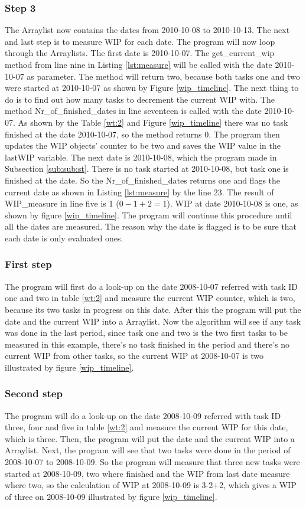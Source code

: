 \documentclass[UKenglish]{ifimaster}  %
\begin{document}
\subsubsection{Step 3}
The Arraylist now contains the dates from 2010-10-08 to 2010-10-13. The next and last step is to measure WIP for each date.  The program will now loop through the Arraylists. The first date is 2010-10-07.  The get\_current\_wip method from line nine in Listing \ref{lst:measure} will be called with the date 2010-10-07 as parameter.  The method will return two, because both tasks one and two were started at 2010-10-07 as shown by Figure \ref{wip_timeline}. The next thing to do is to find out how many tasks to decrement the current WIP with.  The method Nr\_of\_finished\_dates in line seventeen is called with the date 2010-10-07. As shown by the Table \ref{wt:2} and Figure \ref{wip_timeline} there was no task finished at the date 2010-10-07, so the method returns 0. The program then updates the WIP objects' counter to be two and saves the WIP value in the lastWIP variable. The next date is 2010-10-08, which the program made in Subsection \ref{sub:sub:st}. There is no task started at 2010-10-08, but task one is finished at the date. So the Nr\_of\_finished\_dates returns one and flags the current date as shown in Listing \ref{lst:measure} by the line 23. The result of WIP\_measure in line five is 1 ($0-1+2=1$). WIP at date 2010-10-08 is one, as shown by figure \ref{wip_timeline}. The program will continue this procedure until all the dates are measured.  The reason why the date is flagged is to be sure that each date is only evaluated ones.
\iffalse
\subsubsection{First step}
\label{subsubsec:ft}
The program will first do a look-up on the date 2008-10-07 referred with task ID one and two in table \ref{wt:2} and measure the current WIP counter, which is two, because its two tasks in progress on this date. After this the program will put the date and the current WIP into a Arraylist. 
Now the algorithm will see if any task was done in the last period, since task one and two is the two first tasks to be measured in this example, there's no task finished in the period and there's no current WIP from other tasks, so the current WIP at 2008-10-07 is two illustrated by figure \ref{wip_timeline}. 
\subsubsection{Second step}
The program will do a look-up on the date 2008-10-09 referred with task ID three, four and five in table \ref{wt:2}  and measure the current WIP for this date, which is three. Then, the program will put the date and the current WIP into a Arraylist.
Next, the program will see that two tasks were done in the period of 2008-10-07 to 2008-10-09. So the program will measure that three new tasks were started at 2008-10-09, two where finished and the WIP from last date measure where two, so the calculation of WIP at 2008-10-09 is 3-2+2, which gives a WIP of three on 2008-10-09 illustrated by figure \ref{wip_timeline}. 
\end{document}
